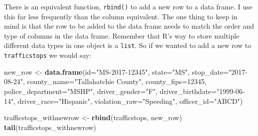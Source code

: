 \documentclass[
]{book}
\newenvironment{Shaded}{\begin{snugshade}}{\end{snugshade}}
\newcommand{\DataTypeTok}[1]{\textcolor[rgb]{0.13,0.29,0.53}{#1}}
\newcommand{\DecValTok}[1]{\textcolor[rgb]{0.00,0.00,0.81}{#1}}
\newcommand{\KeywordTok}[1]{\textcolor[rgb]{0.13,0.29,0.53}{\textbf{#1}}}
\newcommand{\NormalTok}[1]{#1}
\newcommand{\StringTok}[1]{\textcolor[rgb]{0.31,0.60,0.02}{#1}}
\begin{document}
There is an equivalent function, \texttt{rbind()} to add a new row to a data frame. I use this far less frequently than the column equivalent. The one thing to keep in mind is that the row to be added to the data frame needs to match the order and type of columns in the data frame. Remember that R's way to store multiple different data types in one object is a \texttt{list}. So if we wanted to add a new row to \texttt{trafficstops} we would say:

\begin{Shaded}
\begin{Highlighting}[]
\NormalTok{new_row <-}\StringTok{ }\KeywordTok{data.frame}\NormalTok{(}\DataTypeTok{id=}\StringTok{"MS-2017-12345"}\NormalTok{, }\DataTypeTok{state=}\StringTok{"MS"}\NormalTok{, }\DataTypeTok{stop_date=}\StringTok{"2017-08-24"}\NormalTok{,}
                \DataTypeTok{county_name=}\StringTok{"Tallahatchie County"}\NormalTok{, }\DataTypeTok{county_fips=}\DecValTok{12345}\NormalTok{,}
                \DataTypeTok{police_department=}\StringTok{"MSHP"}\NormalTok{, }\DataTypeTok{driver_gender=}\StringTok{"F"}\NormalTok{, }\DataTypeTok{driver_birthdate=}\StringTok{"1999-06-14"}\NormalTok{,}
                \DataTypeTok{driver_race=}\StringTok{"Hispanic"}\NormalTok{, }\DataTypeTok{violation_raw=}\StringTok{"Speeding"}\NormalTok{, }\DataTypeTok{officer_id=}\StringTok{"ABCD"}\NormalTok{)}

\NormalTok{trafficstops_withnewrow <-}\StringTok{ }\KeywordTok{rbind}\NormalTok{(trafficstops, new_row)}
\KeywordTok{tail}\NormalTok{(trafficstops_withnewrow)}
\end{Highlighting}
\end{Shaded}
\end{document}
